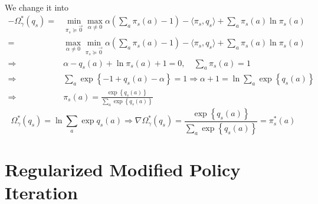 \documentclass[a4paper]{article}
\begin{document}
We change it into 
\begin{align*}
    -\Omega^{*}_{\gamma}(q_s) =& \min_{\pi_{s} \succeq \vec{0}} \max_{\alpha \ne 0} \alpha \left(\sum^{}_{a} \pi_s(a) - 1 \right)-\langle \pi_s, q_s \rangle + \sum^{}_{a} \pi_s(a) \ln \pi_s(a)\\
    =& \max_{\alpha \ne 0} \min_{\pi_s \succeq \vec{0}} \alpha \left(\sum^{}_{a} \pi_s(a) - 1 \right)-\langle \pi_s, q_s \rangle + \sum^{}_{a} \pi_s(a) \ln \pi_s(a)\\
    \Rightarrow&  \alpha - q_s(a) + \ln \pi_{s}(a) + 1 = 0,\quad \sum^{}_{a} \pi_{s}(a) = 1 \\
    \Rightarrow& \sum^{}_{a} \exp\left\{ -1 + q_{s}(a) - \alpha \right\} = 1
    \Rightarrow \alpha + 1 = \ln \sum^{}_{a} \exp\left\{ q_s(a) \right\}\\
    \Rightarrow& \pi_s(a) = \frac{\exp \left\{q_{s}(a) \right\}}{\sum^{}_{a} \exp\left\{ q_s(a) \right\}} 
\end{align*}
\[
    \Omega^{*}_{\gamma}(q_s) = \ln \sum^{}_{a} \exp q_s(a) \Rightarrow \nabla \Omega^*_{\gamma}(q_s) = \frac{\exp\left\{ q_s(a) \right\}}{ \sum^{}_{a} \exp\left\{ q_s(a) \right\}} = \pi^*_s(a)
\]


\section{Regularized Modified Policy Iteration}%
\end{document}
